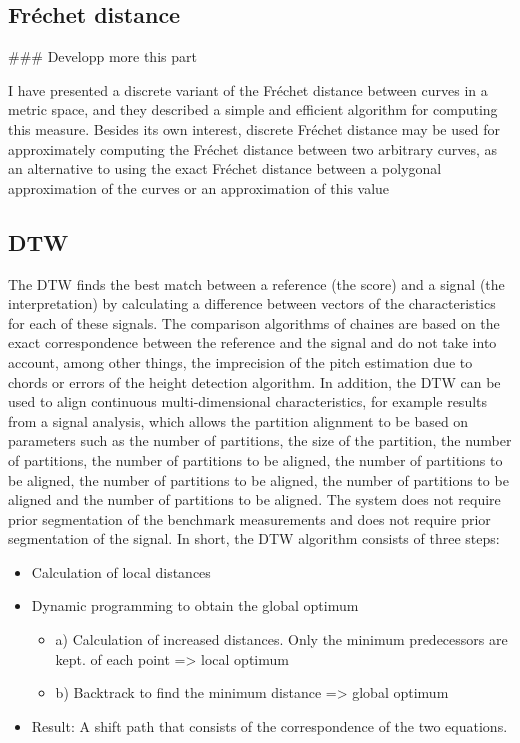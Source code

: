 \documentclass{article}
\begin{document}
\subsection{Fréchet distance}

\#\#\#  Developp more this part 



I have presented a discrete variant of the Fréchet distance \cite{frechet_1906} between curves in a metric
space, and they described a simple and efficient algorithm for computing this measure.
Besides its own interest, discrete Fréchet distance may be used for approximately computing the Fréchet distance between two arbitrary curves, as an alternative to using the exact Fréchet distance between a polygonal approximation of the curves or an approximation of this value

\subsection{DTW}

 The DTW finds the best match between a reference (the score) and a signal (the interpretation) by calculating a difference between vectors of the characteristics for each of these signals. The comparison algorithms of chaines are based on the exact correspondence between the reference and the signal and do not take into account, among other things, the imprecision of the pitch estimation due to chords or errors of the height detection algorithm. In addition, the DTW can be used to align continuous multi-dimensional characteristics, for example results from a signal analysis, which allows the partition alignment to be based on parameters such as the number of partitions, the size of the partition, the number of partitions, the number of partitions to be aligned, the number of partitions to be aligned, the number of partitions to be aligned, the number of partitions to be aligned and the number of partitions to be aligned.
The system does not require prior segmentation of the benchmark measurements and does not require prior segmentation of the
signal.
In short, the DTW algorithm consists of three steps:

\begin{itemize}
    \item Calculation of local distances
    \item Dynamic programming to obtain the global optimum \begin{itemize}
        \item a) Calculation of increased distances. Only the minimum predecessors are kept. of each point => local optimum
        \item b) Backtrack to find the minimum distance => global optimum
    \end{itemize}
    \item Result: A shift path that consists of the correspondence of the two equations.

    
\end{itemize}
\end{document}
